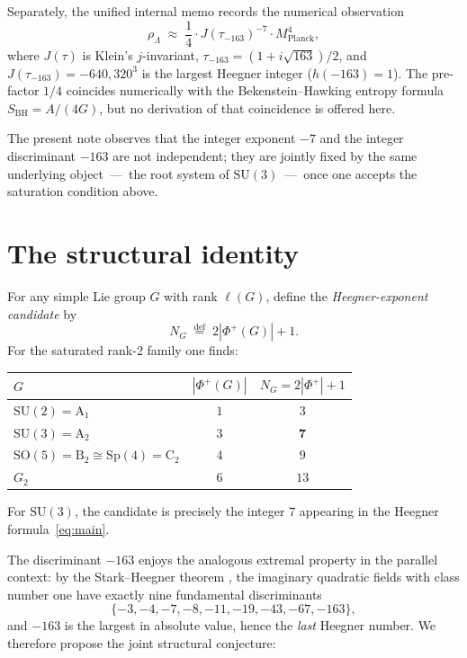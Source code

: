 \documentclass[11pt,a4paper]{article}
\newcommand{\SU}{\mathrm{SU}}
\newcommand{\SO}{\mathrm{SO}}
\newcommand{\Sp}{\mathrm{Sp}}
\newcommand{\Mpl}{M_{\mathrm{Planck}}}
\newcommand{\rhoL}{\rho_{\Lambda}}
\theoremstyle{plain}
\begin{document}
Separately, the unified internal memo \cite{Remondiere2026bigtable} records the numerical observation
\begin{equation}\label{eq:main}
  \rhoL \;\approx\; \frac{1}{4}\cdot J(\tau_{-163})^{-7}\cdot \Mpl^{4},
\end{equation}
where $J(\tau)$ is Klein's $j$-invariant, $\tau_{-163}=(1+i\sqrt{163})/2$, and $J(\tau_{-163})=-640{,}320^{3}$ is the largest Heegner integer ($h(-163)=1$). The pre-factor $1/4$ coincides numerically with the Bekenstein--Hawking entropy formula $S_{\mathrm{BH}}=A/(4G)$, but no derivation of that coincidence is offered here.

The present note observes that the integer exponent $-7$ and the integer discriminant $-163$ are not independent; they are jointly fixed by the same underlying object \,---\, the root system of $\SU(3)$ \,---\, once one accepts the saturation condition above.

\section{The structural identity}

For any simple Lie group $G$ with rank $\ell(G)$, define the \emph{Heegner-exponent candidate} by
\begin{equation}\label{eq:Ndef}
  N_{G} \;\stackrel{\mathrm{def}}{=}\; 2|\Phi^{+}(G)|+1.
\end{equation}
For the saturated rank-2 family one finds:

\begin{center}
\begin{tabular}{lcc}
\toprule
$G$ & $|\Phi^{+}(G)|$ & $N_{G}=2|\Phi^{+}|+1$ \\
\midrule
$\SU(2)=\mathrm{A}_{1}$ & $1$ & $3$ \\
$\SU(3)=\mathrm{A}_{2}$ & $3$ & $\mathbf{7}$ \\
$\SO(5)=\mathrm{B}_{2}\cong\Sp(4)=\mathrm{C}_{2}$ & $4$ & $9$ \\
$G_{2}$ & $6$ & $13$ \\
\bottomrule
\end{tabular}
\end{center}

For $\SU(3)$, the candidate is precisely the integer $7$ appearing in the Heegner formula~\eqref{eq:main}.

The discriminant $-163$ enjoys the analogous extremal property in the parallel context: by the Stark--Heegner theorem \cite{Heegner1952,Stark1967}, the imaginary quadratic fields with class number one have exactly nine fundamental discriminants
\[
  \{-3,-4,-7,-8,-11,-19,-43,-67,-163\},
\]
and $-163$ is the largest in absolute value, hence the \emph{last} Heegner number. We therefore propose the joint structural conjecture:
\end{document}
